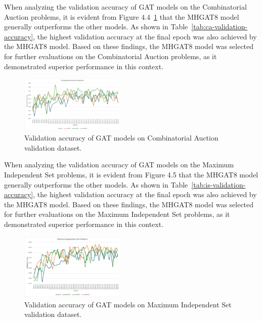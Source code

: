 When analyzing the validation accuracy of GAT models on the Combinatorial Auction problems, it is evident from Figure 4.4~\ref{fig:ca-validation-accuracy} that the MHGAT8 model generally outperforms the other models.
As shown in Table~\ref{tab:ca-validation-accuracy}, the highest validation accuracy at the final epoch was also achieved by the MHGAT8 model.
Based on these findings, the MHGAT8 model was selected for further evaluations on the Combinatorial Auction problems, as it demonstrated superior performance in this context.




\begin{figure}[htb!]
    \centering
    \includegraphics[width=0.45\textwidth]{figures/CA Validation Accuracy}
    \caption{Validation accuracy of GAT models on Combinatorial Auction validation dataset.}
    \label{fig:ca-validation-accuracy}
\end{figure}


When analyzing the validation accuracy of GAT models on the Maximum Independent Set problems, it is evident from Figure 4.5 that the MHGAT8 model generally outperforms the other models.
As shown in Table~\ref{tab:is-validation-accuracy}, the highest validation accuracy at the final epoch was also achieved by the MHGAT8 model.
Based on these findings, the MHGAT8 model was selected for further evaluations on the Maximum Independent Set problems, as it demonstrated superior performance in this context.



\begin{figure}[htb!]
    \centering
    \includegraphics[width=0.45\textwidth]{figures/IS Validation Accuracy}
    \caption{Validation accuracy of GAT models on Maximum Independent Set validation dataset.}
    \label{fig:is-validation-accuracy}
\end{figure}


